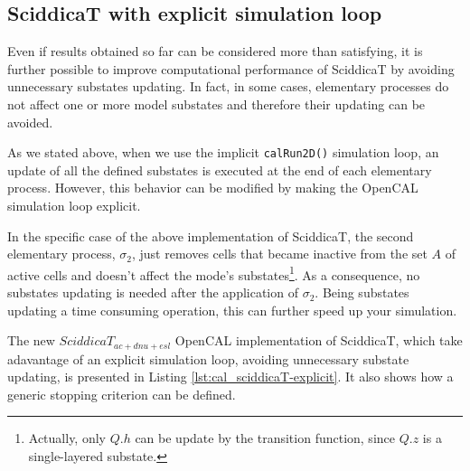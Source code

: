 \subsection{SciddicaT with explicit simulation loop}
Even if results obtained so far can be considered more than
satisfying, it is further possible to improve computational
performance of SciddicaT by avoiding unnecessary substates
updating. In fact, in some cases, elementary processes do not affect
one or more model substates and therefore their updating can be
avoided.

As we stated above, when we use the implicit \verb'calRun2D()'
simulation loop, an update of all the defined substates is executed at
the end of each elementary process. However, this behavior can be
modified by making the OpenCAL simulation loop explicit.

In the specific case of the above implementation of SciddicaT, the
second elementary process, $\sigma_2$, just removes cells that became
inactive from the set $A$ of active cells and doesn't affect the
mode's substates\footnote{Actually, only $Q.h$ can be update by the
  transition function, since $Q.z$ is a single-layered substate.}. As
a consequence, no substates updating is needed after the application
of $\sigma_2$. Being substates updating a time consuming operation,
this can further speed up your simulation.

The new $SciddicaT_{ac+dnu+esl}$ OpenCAL implementation of SciddicaT,
which take adavantage of an explicit simulation loop, avoiding
unnecessary substate updating, is presented in Listing
\ref{lst:cal_sciddicaT-explicit}. It also shows how a generic stopping
criterion can be defined.





